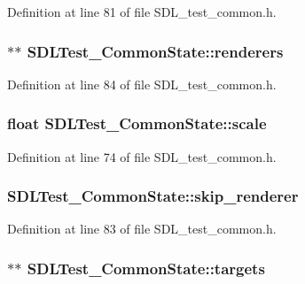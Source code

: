 Definition at line 81 of file S\-D\-L\-\_\-test\-\_\-common.\-h.

\hypertarget{struct_s_d_l_test___common_state_aeb35b7f12f63256c92a9813e682043c1}{
\subsubsection[{renderers}]{$\ast$$\ast$ S\-D\-L\-Test\-\_\-\-Common\-State\-::renderers}}\label{struct_s_d_l_test___common_state_aeb35b7f12f63256c92a9813e682043c1}


Definition at line 84 of file S\-D\-L\-\_\-test\-\_\-common.\-h.

\hypertarget{struct_s_d_l_test___common_state_ad2d2821689008f2fd65034eb8040fb3c}{
\subsubsection[{scale}]{\setlength{\rightskip}{0pt plus 5cm}float S\-D\-L\-Test\-\_\-\-Common\-State\-::scale}}\label{struct_s_d_l_test___common_state_ad2d2821689008f2fd65034eb8040fb3c}


Definition at line 74 of file S\-D\-L\-\_\-test\-\_\-common.\-h.

\hypertarget{struct_s_d_l_test___common_state_a41527c9f496fb3326802de595aa0f306}{
\subsubsection[{skip\-\_\-renderer}]{ S\-D\-L\-Test\-\_\-\-Common\-State\-::skip\-\_\-renderer}}\label{struct_s_d_l_test___common_state_a41527c9f496fb3326802de595aa0f306}


Definition at line 83 of file S\-D\-L\-\_\-test\-\_\-common.\-h.

\hypertarget{struct_s_d_l_test___common_state_a3fcf7d8f0f8d2f2351a75b5966cf9fe4}{
\subsubsection[{targets}]{$\ast$$\ast$ S\-D\-L\-Test\-\_\-\-Common\-State\-::targets}}\label{struct_s_d_l_test___common_state_a3fcf7d8f0f8d2f2351a75b5966cf9fe4}


